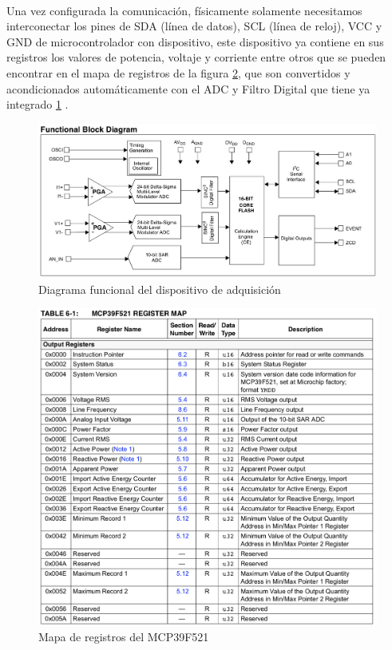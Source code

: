 \paragraph{}
Una vez configurada la comunicación, físicamente solamente necesitamos interconectar los pines de SDA (línea de datos), SCL (línea de reloj), VCC y GND de microcontrolador con dispositivo, este dispositivo ya contiene en sus registros los valores de potencia, voltaje y corriente entre otros que se pueden encontrar en el mapa de registros de la figura \ref{fig:Mapa de registros del MCP39F521}, que son convertidos y acondicionados automáticamente con el ADC y Filtro Digital que tiene ya integrado \ref{fig:Diagrama funcional} .

\begin{figure}[H]
	\centering
	\includegraphics[scale=.4]{Capitulo5/images/MCP_diagrama_funcional.png}
	\caption{Diagrama funcional del dispositivo de adquisición}
	\label{fig:Diagrama funcional}
\end{figure}

\begin{figure}[H]
	\centering
	\includegraphics[scale=.5]{Capitulo5/images/register_map.png}
	\caption{Mapa de registros del MCP39F521}
	\label{fig:Mapa de registros del MCP39F521}
\end{figure}

